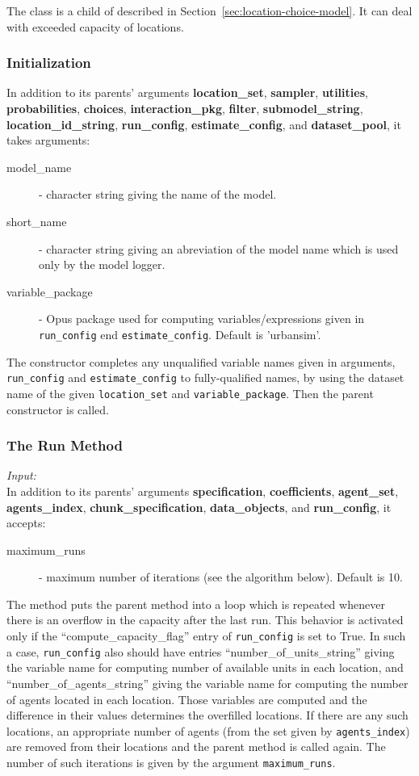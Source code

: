 The class  is a child
of  described in
Section~\ref{sec:location-choice-model}. It can deal with exceeded capacity of locations.

\subsubsection{Initialization}
%
In addition to its parents' arguments {\bf location_set}, {\bf sampler}, {\bf utilities}, {\bf probabilities}, 
{\bf choices}, {\bf interaction_pkg}, {\bf filter}, {\bf submodel_string}, {\bf location_id_string}, 
{\bf run_config}, {\bf estimate_config}, and {\bf dataset_pool}, it takes arguments:
\begin{description}
\item[model_name] - character string giving the name of the model.
\item[short_name] - character string giving an abreviation of the model name which is used 
only by the model logger.
\item[variable_package] - Opus package used for computing variables/expressions given in \verb|run_config|
end \verb|estimate_config|. Default is 'urbansim'.
\end{description}

The constructor completes any unqualified variable names given in 
arguments, \verb|run_config| and \verb|estimate_config| to fully-qualified
names, by using the dataset name of the given \verb|location_set| and  \verb|variable_package|.
Then the parent constructor is called.

\subsubsection{The Run Method}
%
{\it Input:}\\[1mm]
In addition to its parents' arguments {\bf specification}, {\bf coefficients}, {\bf agent_set}, {\bf agents_index},
{\bf chunk_specification}, {\bf data_objects}, and {\bf run_config}, it accepts:
\begin{description}
\item[maximum_runs] - maximum number of iterations (see the algorithm below). Default is 10.
\end{description}
The method puts the parent method
 into a loop which is repeated whenever there is an
overflow in the capacity after the last run. This behavior is
activated only if the ``compute_capacity_flag'' entry of
\verb|run_config| is set to True. In such a case, \verb|run_config|
also should have entries ``number_of_units_string'' giving the
variable name for computing number of available
units in each location, and ``number_of_agents_string'' giving the
variable name for computing the number of agents
located in each location. Those variables are
computed and the difference in their values determines the
overfilled locations. If there are any such locations, an
appropriate number of agents (from the set given by
\verb|agents_index|) are removed from their locations and the parent
 method is called again. The number of such iterations is
given by the argument \verb|maximum_runs|.

